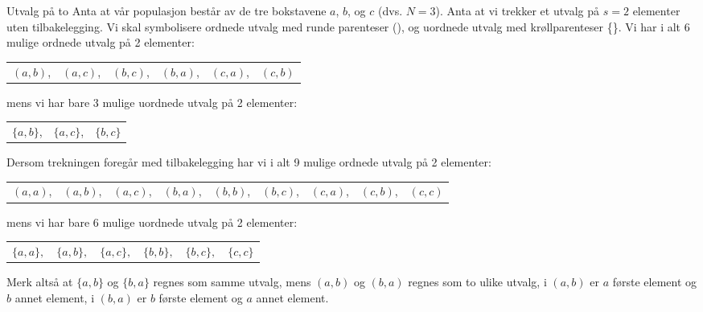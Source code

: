 \begin{eksempel}{Utvalg på to}
Anta at vår populasjon består av de tre bokstavene $a$, $b$, og $c$
(dvs. $N=3$). Anta at vi trekker et utvalg på $s=2$ elementer
uten tilbakelegging. Vi skal symbolisere ordnede utvalg med runde
parenteser (), og uordnede utvalg med krøllparenteser \{\}. Vi
har i alt 6 mulige ordnede utvalg på 2 elementer:
\begin{center}
\begin{tabular}{cccccc}
   $(a,b)$,&$(a,c)$,&$(b,c)$,&$(b,a)$,&$(c,a)$,&$(c,b)$ \\
\end{tabular}
\end{center}
mens vi har bare 3 mulige uordnede utvalg på 2 elementer:
\begin{center}
\begin{tabular}{ccc}
   $\{a,b\}$,&$\{a,c\}$,&$\{b,c\} $ \\
\end{tabular}
\end{center}

\noindent Dersom trekningen foregår med tilbakelegging har vi i alt 9
mulige ordnede utvalg på 2 elementer:
\begin{center}
\begin{tabular}{ccccccccc}
 $(a,a)$,&$(a,b)$,&$(a,c)$,&$(b,a)$,&$(b,b)$,&$(b,c)$,&$(c,a)$,&$(c,b)$,&
     $(c,c)$ \\
\end{tabular}
\end{center}
mens vi har bare 6 mulige uordnede utvalg på 2 elementer:
\begin{center}
\begin{tabular}{cccccc}
  $\{a,a\},$&$\{a,b\},$&$\{a,c\},$&$\{b,b\},$&$\{b,c\},$&$\{c,c\}$ \\
\end{tabular}
\end{center}
Merk altså at $\{a,b\}$ og $\{b,a\}$ regnes som samme utvalg,
mens $(a,b)$ og $(b,a)$ regnes som to ulike utvalg, i $(a,b)$ er
$a$ første element og $b$ annet element, i $(b,a)$ er $b$ første
element og $a$ annet element.
\end{eksempel}


